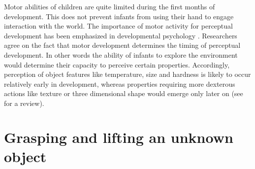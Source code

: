 Motor abilities of children are quite limited during the first
months of development. This does not prevent infants from using
their hand to engage interaction with the world. The importance of
motor activity for perceptual development has been emphasized in
developmental psychology \cite{hofsten04motor,gibson88explore}.
Researchers agree on the fact that motor development determines
the timing of perceptual development. In other words the ability
of infants to explore the environment would determine their
capacity to perceive certain properties. Accordingly, perception
of object features like temperature, size and hardness is likely
to occur relatively early in development, whereas properties
requiring more dexterous actions like texture or three dimensional
shape would emerge only later on (see \cite{bushnell93motor} for a
review).

%

\section{Grasping and lifting an unknown object}
\label{sec:controlling}
%
